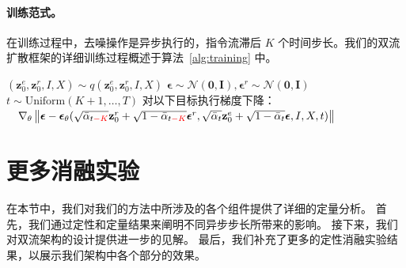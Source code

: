 \paragraph{训练范式。}
在训练过程中，去噪操作是异步执行的，指令流滞后 $K$ 个时间步长。我们的双流扩散框架的详细训练过程概述于算法~\ref{alg:training} 中。

\begin{algorithm*}[h]
  \caption{异步双流扩散模型 $\bm{\epsilon}_{\theta}$ 的训练}
  \label{alg:training}
  \small
  \begin{algorithmic}[1]
    \Repeat
      \State $(\textbf{z}_0^e, \textbf{z}_0^r, I, X) \sim q(\textbf{z}_0^e, \textbf{z}_0^r, I, X)$
      \State $\bm{\epsilon} \sim \mathcal{N}(\mathbf{0}, \mathbf{I}), \bm{\epsilon}^r \sim \mathcal{N}(\mathbf{0}, \mathbf{I})$
      \State $t \sim \text{Uniform}({K+1,\ldots,T})$
      \State 对以下目标执行梯度下降：
      \State
      $ \quad \nabla_\theta \left\| \bm{\epsilon} - \bm{\epsilon}_\theta(\sqrt{\bar{\alpha}_{t\textcolor{red}{-K}}} \textbf{z}_0^r+\sqrt{1-\bar{\alpha}_{t\textcolor{red}{-K}}} \bm{\epsilon}^r,
      \sqrt{\bar{\alpha}_{t}} \textbf{z}_0^e+\sqrt{1-\bar{\alpha}_{t}} \bm{\epsilon}, I, X, t) \right\|$
  \end{algorithmic}
\end{algorithm*}


\section{更多消融实验}
在本节中，我们对我们的方法中所涉及的各个组件提供了详细的定量分析。
首先，我们通过定性和定量结果来阐明不同异步步长所带来的影响。
接下来，我们对双流架构的设计提供进一步的见解。
最后，我们补充了更多的定性消融实验结果，以展示我们架构中各个部分的效果。

